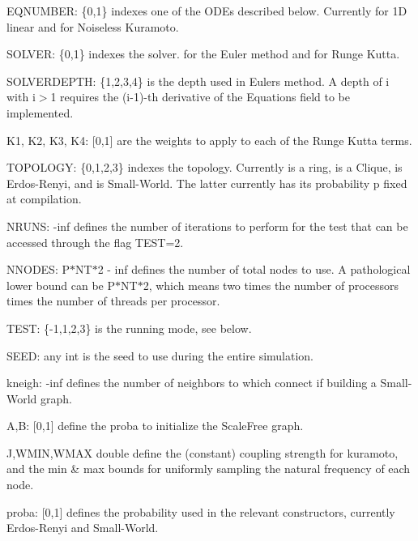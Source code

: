 \begin{DoxyItemize}
\item E\+Q\+N\+U\+M\+B\+ER\+: {\ttfamily \{0,1\}} indexes one of the O\+D\+Es described below. Currently {} for 1D linear and {} for Noiseless Kuramoto.
\item S\+O\+L\+V\+ER\+: {\ttfamily \{0,1\}} indexes the solver. {} for the Euler method and {} for Runge Kutta.
\item S\+O\+L\+V\+E\+R\+D\+E\+P\+TH\+: {\ttfamily \{1,2,3,4\}} is the depth used in Euler\textquotesingle{}s method. A depth of i with i$>$1 requires the (i-\/1)-\/th derivative of the Equation\textquotesingle{}s field to be implemented.
\item K1, K2, K3, K4\+: {\ttfamily \mbox{[}0,1\mbox{]}} are the weights to apply to each of the Runge Kutta terms.
\item T\+O\+P\+O\+L\+O\+GY\+: {\ttfamily \{0,1,2,3\}} indexes the topology. Currently {} is a ring, {} is a Clique, {} is Erdos-\/\+Renyi, and {} is Small-\/\+World. The latter currently has its probability p fixed at compilation.
\item N\+R\+U\+NS\+: {-\/inf} defines the number of iterations to perform for the test that can be accessed through the flag T\+E\+ST=2.
\item N\+N\+O\+D\+ES\+: {\ttfamily P$\ast$\+N\+T$\ast$2 -\/ inf} defines the number of total nodes to use. A pathological lower bound can be P$\ast$\+N\+T$\ast$2, which means two times the number of processors times the number of threads per processor.
\item T\+E\+ST\+: {\ttfamily \{-\/1,1,2,3\}} is the running mode, see below.
\item S\+E\+ED\+: {\ttfamily any int} is the seed to use during the entire simulation.
\item kneigh\+: {-\/inf} defines the number of neighbors to which connect if building a Small-\/\+World graph.
\item A,B\+: {\ttfamily \mbox{[}0,1\mbox{]}} define the proba to initialize the Scale\+Free graph.
\item J,W\+M\+IN,W\+M\+AX {\ttfamily double} define the (constant) coupling strength for kuramoto, and the min \& max bounds for uniformly sampling the natural frequency of each node.
\item proba\+: {\ttfamily \mbox{[}0,1\mbox{]}} defines the probability used in the relevant constructors, currently Erdos-\/\+Renyi and Small-\/\+World.

\end{DoxyItemize}
